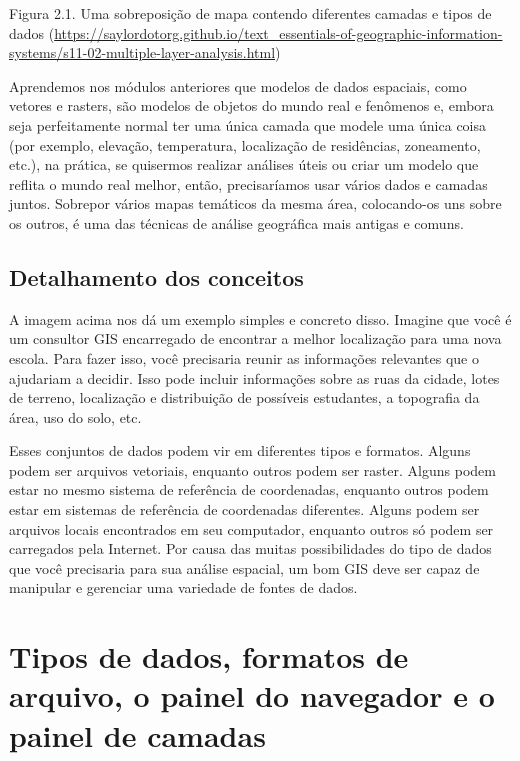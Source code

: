 \documentclass[
  portuguese,
]{krantz}
\begin{document}
Figura 2.1. Uma sobreposição de mapa contendo diferentes camadas e tipos de dados (\href{https://saylordotorg.\%20github.io/text_essentials-of-geographic-information-systems/s11-02-multiple-layer-analysis.html}{https://saylordotorg.github.io/text\_essentials-of-geographic-information-systems/s11-02-multiple-layer-analysis.html})

Aprendemos nos módulos anteriores que modelos de dados espaciais, como vetores e rasters, são modelos de objetos do mundo real e fenômenos e, embora seja perfeitamente normal ter uma única camada que modele uma única coisa (por exemplo, elevação, temperatura, localização de residências, zoneamento, etc.), na prática, se quisermos realizar análises úteis ou criar um modelo que reflita o mundo real melhor, então, precisaríamos usar vários dados e camadas juntos. Sobrepor vários mapas temáticos da mesma área, colocando-os uns sobre os outros, é uma das técnicas de análise geográfica mais antigas e comuns.

\hypertarget{detalhamento-dos-conceitos}{%
\subsection{Detalhamento dos conceitos}\label{detalhamento-dos-conceitos}}

A imagem acima nos dá um exemplo simples e concreto disso. Imagine que você é um consultor GIS encarregado de encontrar a melhor localização para uma nova escola. Para fazer isso, você precisaria reunir as informações relevantes que o ajudariam a decidir. Isso pode incluir informações sobre as ruas da cidade, lotes de terreno, localização e distribuição de possíveis estudantes, a topografia da área, uso do solo, etc.

Esses conjuntos de dados podem vir em diferentes tipos e formatos. Alguns podem ser arquivos vetoriais, enquanto outros podem ser raster. Alguns podem estar no mesmo sistema de referência de coordenadas, enquanto outros podem estar em sistemas de referência de coordenadas diferentes. Alguns podem ser arquivos locais encontrados em seu computador, enquanto outros só podem ser carregados pela Internet. Por causa das muitas possibilidades do tipo de dados que você precisaria para sua análise espacial, um bom GIS deve ser capaz de manipular e gerenciar uma variedade de fontes de dados.

\hypertarget{tipos-de-dados-formatos-de-arquivo-o-painel-do-navegador-e-o-painel-de-camadas}{%
\section{Tipos de dados, formatos de arquivo, o painel do navegador e o painel de camadas}\label{tipos-de-dados-formatos-de-arquivo-o-painel-do-navegador-e-o-painel-de-camadas}}
\end{document}
